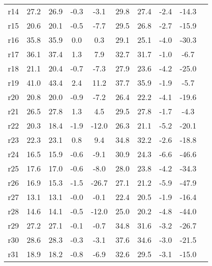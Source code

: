 \begin{tabular*}{\hsize}{ @{\extracolsep{\fill}}l*{9}{c}}
%
r14                      &27.2     &26.9     &-0.3     &-3.1     &29.8     &27.4     &-2.4     &-14.3\\
%
r15                      &20.6     &20.1     &-0.5     &-7.7     &29.5     &26.8     &-2.7     &-15.9\\
%
r16                      &35.8     &35.9     & 0.0     & 0.3     &29.1     &25.1     &-4.0     &-30.3\\
%
r17                      &36.1     &37.4     & 1.3     & 7.9     &32.7     &31.7     &-1.0     &-6.7\\
%
r18                      &21.1     &20.4     &-0.7     &-7.3     &27.9     &23.6     &-4.2     &-25.0\\
%
r19                      &41.0     &43.4     & 2.4     &11.2     &37.7     &35.9     &-1.9     &-5.7\\
%
r20                      &20.8     &20.0     &-0.9     &-7.2     &26.4     &22.2     &-4.1     &-19.6\\
%
r21                      &26.5     &27.8     & 1.3     & 4.5     &29.5     &27.8     &-1.7     &-4.3\\
%
r22                      &20.3     &18.4     &-1.9     &-12.0     &26.3     &21.1     &-5.2     &-20.1\\
%
r23                      &22.3     &23.1     & 0.8     & 9.4     &34.8     &32.2     &-2.6     &-18.8\\
%
r24                      &16.5     &15.9     &-0.6     &-9.1     &30.9     &24.3     &-6.6     &-46.6\\
%
r25                      &17.6     &17.0     &-0.6     &-8.0     &28.0     &23.8     &-4.2     &-34.3\\
%
r26                      &16.9     &15.3     &-1.5     &-26.7     &27.1     &21.2     &-5.9     &-47.9\\
%
r27                      &13.1     &13.1     &-0.0     &-0.1     &22.4     &20.5     &-1.9     &-16.4\\
%
r28                      &14.6     &14.1     &-0.5     &-12.0     &25.0     &20.2     &-4.8     &-44.0\\
%
r29                      &27.2     &27.1     &-0.1     &-0.7     &34.8     &31.6     &-3.2     &-26.7\\
%
r30                      &28.6     &28.3     &-0.3     &-3.1     &37.6     &34.6     &-3.0     &-21.5\\
%
r31                      &18.9     &18.2     &-0.8     &-6.9     &32.6     &29.5     &-3.1     &-15.0\\

\end{tabular*}
